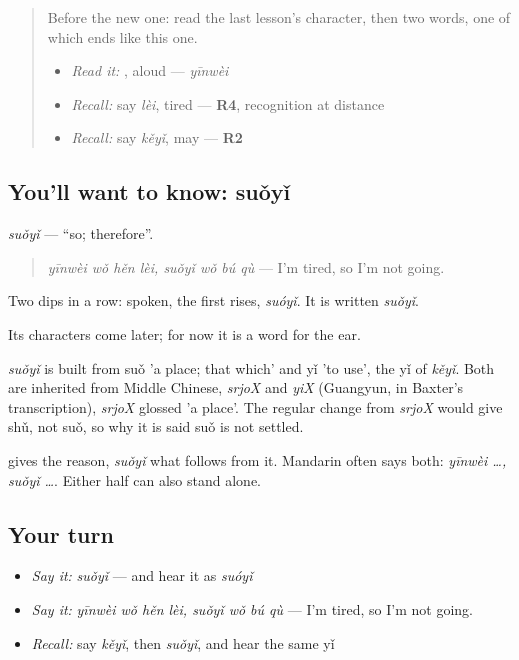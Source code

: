 \begin{quote}
Before the new one: read the last lesson's character, then two words, one of which ends like this one.

\begin{itemize}
\raggedright
  \item \emph{Read it:} , aloud — \emph{yīnwèi}
  \item \emph{Recall:} say \emph{lèi}, tired — \textbf{R4}, recognition at distance
  \item \emph{Recall:} say \emph{kěyǐ}, may — \textbf{R2}
\end{itemize}
\end{quote}

\subsection*{You'll want to know: suǒyǐ}
\emph{suǒyǐ} — \textquotedblleft{}so; therefore\textquotedblright{}.

\begin{quote}
\emph{yīnwèi wǒ hěn lèi, suǒyǐ wǒ bú qù} — I'm tired, so I'm not going.
\end{quote}

Two dips in a row: spoken, the first rises, \emph{suóyǐ}. It is written \emph{suǒyǐ}.

Its characters come later; for now it is a word for the ear.

\begin{cousinweb}
\emph{suǒyǐ} is built from suǒ 'a place; that which' and yǐ 'to use', the yǐ of \emph{kěyǐ}. Both are inherited from Middle Chinese, \emph{srjoX} and \emph{yiX} (Guangyun, in Baxter's transcription), \emph{srjoX} glossed 'a place'. The regular change from \emph{srjoX} would give shǔ, not suǒ, so why it is said suǒ is not settled.
\end{cousinweb}

\begin{grammarlens}[title={What you've built}]
 gives the reason, \emph{suǒyǐ} what follows from it. Mandarin often says both: \emph{yīnwèi …, suǒyǐ …}. Either half can also stand alone.
\end{grammarlens}

\subsection*{Your turn}
\begin{itemize}
\raggedright
  \item \emph{Say it:} \emph{suǒyǐ} — and hear it as \emph{suóyǐ}
  \item \emph{Say it:} \emph{yīnwèi wǒ hěn lèi, suǒyǐ wǒ bú qù} — I'm tired, so I'm not going.
  \item \emph{Recall:} say \emph{kěyǐ}, then \emph{suǒyǐ}, and hear the same yǐ
\end{itemize}

